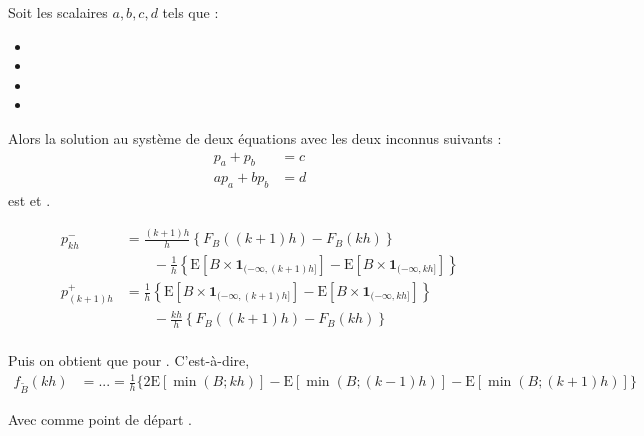 \documentclass[10pt, french]{article}
\begin{document}
\begin{multicols*}{2}
\bigskip

\begin{definitionNOHFILLpropos}[Lemme]
Soit les scalaires $a, b, c, d$ tels que :
\begin{itemize}
	\item	{}
	\item	{}
	\item	{}
	\item	{}
\end{itemize}

Alors la solution au système de deux équations avec les deux inconnus suivants : 
\begin{align*}
	p_{a}	+	p_{b}	&=	c	\\
	ap_{a}	+	bp_{b}	&=	d
\end{align*}
est  et .
\end{definitionNOHFILLpropos}

\begin{definitionNOHFILLprop}
\setlength{\mathindent}{-1cm}
\begin{align*}
	p^{-}_{kh}
	&=	\frac{(k + 1)h}{h} \left\{
			F_{B}((k + 1)h)	-	F_{B}(kh)
		\right\}		\\	&\quad\quad	-	\frac{1}{h} \left\{
			\text{E}[B \times \bm{1}_{(-\infty, (k + 1)h]}]	-	\text{E}[B \times \bm{1}_{(-\infty, kh]}]	
		\right\}	\\
	p^{+}_{(k + 1)h}
	&=	\frac{1}{h} \left\{
			\text{E}[B \times \bm{1}_{(-\infty, (k + 1)h]}]	-	\text{E}[B \times \bm{1}_{(-\infty, kh]}]
		\right\}			\\	&\quad\quad -\frac{kh}{h} \left\{
			F_{B}((k + 1)h)	-	F_{B}(kh)
		\right\}		\\
\end{align*}

Puis on obtient que pour  . C'est-à-dire, 
\begin{align*}
	f_{\tilde{B}}(kh)
	&=	...
	=	\frac{1}{h}	\bigg\{
		2\text{E}[\min(B; kh)]	-	\text{E}[\min(B; (k - 1)h)]		-	\text{E}[\min(B; (k + 1)h)]	
		\bigg\}
\end{align*}
\setlength{\mathindent}{1cm}

Avec comme point de départ .


\end{definitionNOHFILLprop}
\end{multicols*}
\end{document}
